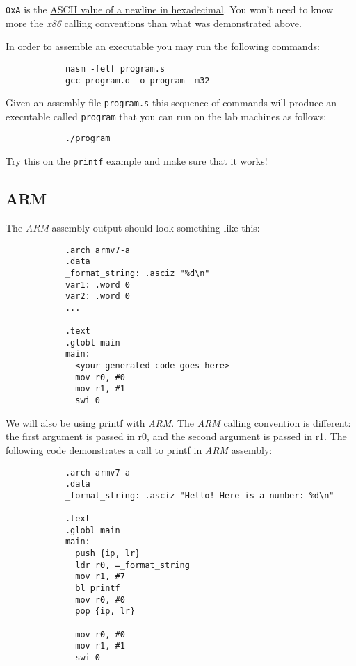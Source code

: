 \documentclass{article}
\newcommand{\code}[1]{\texttt{\textmd{#1}}}
\begin{document}
		\texttt{0xA} is the \href{http://www.asciitable.com/}{ASCII value of a newline in hexadecimal}. You won't need
		to know more the \textit{x86} calling conventions than what was demonstrated above.

		In order to assemble an executable you may run the following commands:

		\begin{lstlisting}
			nasm -felf program.s
			gcc program.o -o program -m32
		\end{lstlisting}

		Given an assembly file \texttt{program.s} this sequence of commands will produce an executable called
		\texttt{program} that you can run on the lab machines as follows:

		\begin{lstlisting}
			./program
		\end{lstlisting}

		Try this on the \code{printf} example and make sure that it works!


	\subsection{ARM}

		The \textit{ARM} assembly output should look something like this:

		\begin{lstlisting}
			.arch armv7-a
			.data
			_format_string: .asciz "%d\n"
			var1: .word 0
			var2: .word 0
			...

			.text
			.globl main
			main:
			  <your generated code goes here>
			  mov r0, #0
			  mov r1, #1
			  swi 0
		\end{lstlisting}

		We will also be using printf with \textit{ARM}. The \textit{ARM} calling convention is different: the first
		argument is passed in r0, and the second argument is passed in r1. The following code demonstrates a call to
		printf in \textit{ARM} assembly:

		\begin{lstlisting}
			.arch armv7-a
			.data
			_format_string: .asciz "Hello! Here is a number: %d\n"

			.text
			.globl main
			main:
			  push {ip, lr}
			  ldr r0, =_format_string
			  mov r1, #7
			  bl printf
			  mov r0, #0
			  pop {ip, lr}

			  mov r0, #0
			  mov r1, #1
			  swi 0
		\end{lstlisting}
\end{document}
